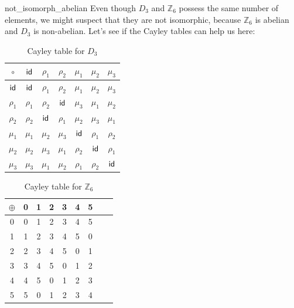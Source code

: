 \begin{example}{not_isomorph_abelian}
Even though $D_3$ and ${\mathbb Z}_6$ possess the same number of elements, we might suspect that they are not isomorphic, because ${\mathbb Z}_6$ is abelian and $D_3$ is non-abelian.  Let's see if the  Cayley tables can help us here:

\begin{table}[H]
{\small
\begin{center}
\begin{tabular}{c|cccccc}
$\circ$  & $\sf{id}$     & $\rho_1$ & $\rho_2$ & $\mu_1$ & $\mu_2$ & $\mu_3$ \\
\hline
$\sf{id}$     & $\sf{id}$     & $\rho_1$ & $\rho_2$ & $\mu_1$ & $\mu_2$ & $\mu_3$ \\
$\rho_1$ & $\rho_1$ & $\rho_2$ & $\sf{id}$     & $\mu_3$ & $\mu_1$ & $\mu_2$ \\
$\rho_2$ & $\rho_2$ & $\sf{id}$     & $\rho_1$ & $\mu_2$ & $\mu_3$ & $\mu_1$ \\
$\mu_1$  & $\mu_1$  & $\mu_2$  & $\mu_3$  & $\sf{id}$    & $\rho_1$& $\rho_2$\\
$\mu_2$  & $\mu_2$  & $\mu_3$  & $\mu_1$  & $\rho_2$& $\sf{id}$    & $\rho_1$\\
$\mu_3$  & $\mu_3$  & $\mu_1$  & $\mu_2$  & $\rho_1$& $\rho_2$& $\sf{id}$
\end{tabular}
\end{center}
}
\caption{Cayley table for $D_3$}
\label{D3_table}
\end{table}

\begin{table}[H]
\caption{Cayley table for ${\mathbb Z}_6$}
\label{Z6_add_table}
{\small
\begin{center}
\begin{tabular}{c|cccccccc}
$\oplus$ & 0 & 1 & 2 & 3 & 4 & 5  \\
\hline
0        & 0 & 1 & 2 & 3 & 4 & 5  \\
1       & 1 & 2 & 3 & 4 & 5 & 0  \\
2       & 2 & 3 & 4 & 5 & 0 & 1\\
3       & 3 & 4 & 5 & 0 & 1 & 2 \\
4       & 4 & 5 & 0 & 1 & 2 & 3 \\
5       & 5 & 0 & 1 & 2 & 3 & 4 \\

\end{tabular}
\end{center}
}
\end{table}


\end{example}
